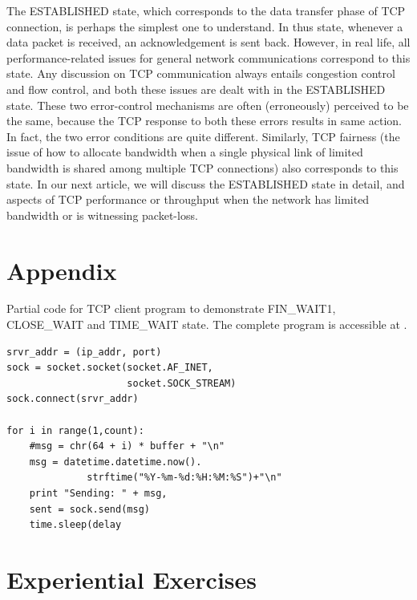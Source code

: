 \begin{multicols}{2}
The ESTABLISHED state, which corresponds to the data transfer phase of TCP connection, is perhaps the simplest one to understand. In thus state, whenever a data packet is received, an acknowledgement is sent back. However, in real life, all performance-related issues for general network communications correspond to this state. Any discussion on TCP communication always entails congestion control and flow control, and both these issues are dealt with in the ESTABLISHED state. These two error-control mechanisms are often (erroneously) perceived to be the same, because the TCP response to both these errors results in same action. In fact, the two error conditions are quite different. Similarly, TCP fairness (the issue of how to allocate bandwidth when a single physical link of limited bandwidth is shared among multiple TCP connections) also corresponds to this state. In our next article, we will discuss the ESTABLISHED state in detail, and aspects of TCP performance or throughput when the network has limited bandwidth or is witnessing packet-loss.

\section*{Appendix}

Partial code for TCP client program to demonstrate FIN\_WAIT1, CLOSE\_WAIT and TIME\_WAIT state. The complete program is accessible at \cite{chap3-key10}.
\begin{verbatim}
srvr_addr = (ip_addr, port)
sock = socket.socket(socket.AF_INET, 
                     socket.SOCK_STREAM)
sock.connect(srvr_addr)

for i in range(1,count):
    #msg = chr(64 + i) * buffer + "\n"
    msg = datetime.datetime.now().
	          strftime("%Y-%m-%d:%H:%M:%S")+"\n"
    print "Sending: " + msg,
    sent = sock.send(msg)
    time.sleep(delay
\end{verbatim}

\section*{Experiential Exercises}


\end{multicols}
